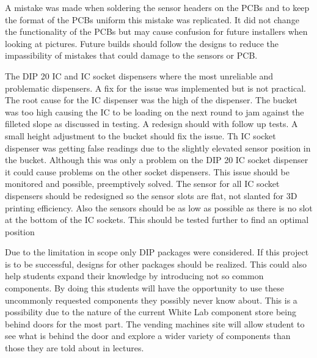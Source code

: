 \documentclass[a4paper,11pt]{article}
\numberwithin{figure}{section}
\numberwithin{table}{section}
\begin{document}
A mistake was made when soldering the sensor headers on the PCBs and to keep the format of the PCBs uniform this mistake was replicated. It did not change the functionality of the PCBs but may cause confusion for future installers when looking at pictures. Future builds should follow the designs to reduce the impassibility of mistakes that could damage to the sensors or PCB.

The DIP 20 IC and IC socket dispensers where the most unreliable and problematic dispensers. A fix for the issue was implemented but is not practical. The root cause for the IC dispenser was the high of the dispenser. The bucket was too high causing the IC to be loading on the next round to jam against the filleted slope as discussed in testing. A redesign should with follow up tests. A small height adjustment to the bucket should fix the issue. Th IC socket dispenser was getting false readings due to the slightly elevated sensor position in the bucket. Although this was only a problem on the DIP 20 IC socket dispenser it could cause problems on the other socket dispensers. This issue should be monitored and possible, preemptively solved. The sensor for all IC socket dispensers should be redesigned so the sensor slots are flat, not slanted for 3D printing efficiency. Also the sensors should be as low as possible as there is no slot at the bottom of the IC sockets. This should be tested further to find an optimal position


Due to the limitation in scope only DIP packages were considered. If this project is to be successful, designs for other packages should be realized. This could also help students expand their knowledge by introducing not so common components. By doing this students will have the opportunity to use these uncommonly requested components they possibly never know about. This is a possibility due to the nature of the current White Lab component store being behind doors for the most part. The vending machines site will allow student to see what is behind the door and explore a wider variety of components than those they are told about in lectures.
\end{document}
